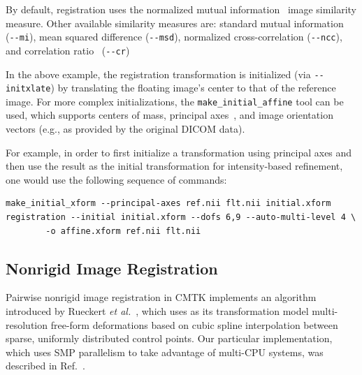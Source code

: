\documentclass{InsightArticle}
\begin{document}
By default, registration uses the normalized mutual
information~\cite{StudHillHawk:1999} image similarity measure. Other available
similarity measures are: standard mutual
information~\cite{MaesCollVand:1997,WellViolAtsu:1996} (\verb|--mi|), mean
squared difference (\verb|--msd|), normalized cross-correlation
(\verb|--ncc|), and correlation ratio~\cite{RochMalaPenn:1998a} (\verb|--cr|)

In the above example, the registration transformation is initialized (via
\verb|--initxlate|) by translating the floating image's center to that of the
reference image. For more complex initializations, the
\verb|make_initial_affine| tool can be used, which supports centers of mass,
principal axes~\cite{AlpeBradKenn:1990}, and image orientation vectors (e.g.,
as provided by the original DICOM data).

For example, in order to first initialize a transformation using principal
axes and then use the result as the initial transformation for intensity-based
refinement, one would use the following sequence of commands:
\begin{verbatim}
make_initial_xform --principal-axes ref.nii flt.nii initial.xform
registration --initial initial.xform --dofs 6,9 --auto-multi-level 4 \
        -o affine.xform ref.nii flt.nii
\end{verbatim}

\subsection{Nonrigid Image Registration}

Pairwise nonrigid image registration in CMTK implements an algorithm
introduced by Rueckert {\em et al.\/}~\cite{RuecSonoHaye:1999}, which uses
as its transformation model multi-resolution free-form deformations based on
cubic spline interpolation between sparse, uniformly distributed control
points. Our particular implementation, which uses SMP parallelism to take
advantage of multi-CPU systems, was described in Ref.~\cite{RohlMaur:2003}.
\end{document}
